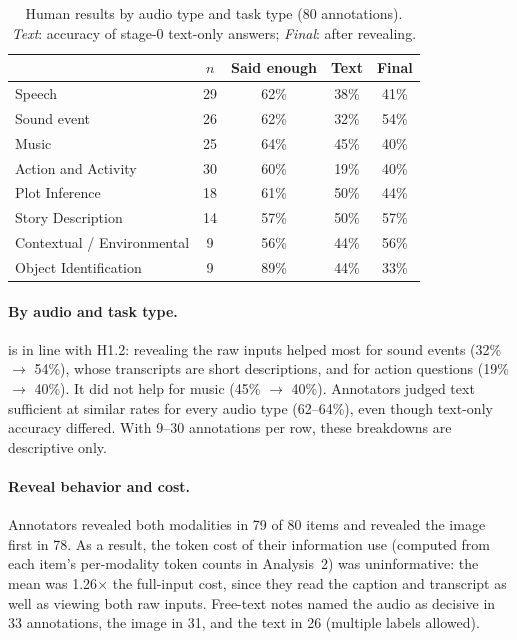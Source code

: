 \begin{table}[h]
\caption{Human results by audio type and task type (80 annotations). \emph{Text}: accuracy of stage-0
text-only answers; \emph{Final}: after revealing.}
\label{tab:app-human-breakdown}
\centering\small
\setlength{\tabcolsep}{4pt}
\begin{tabular}{lcccc}
\toprule
 & $n$ & Said enough & Text & Final \\
\midrule
Speech      & 29 & 62\% & 38\% & 41\% \\
Sound event & 26 & 62\% & 32\% & 54\% \\
Music       & 25 & 64\% & 45\% & 40\% \\
\midrule
Action and Activity          & 30 & 60\% & 19\% & 40\% \\
Plot Inference               & 18 & 61\% & 50\% & 44\% \\
Story Description            & 14 & 57\% & 50\% & 57\% \\
Contextual / Environmental   &  9 & 56\% & 44\% & 56\% \\
Object Identification        &  9 & 89\% & 44\% & 33\% \\
\bottomrule
\end{tabular}
\end{table}

\paragraph{By audio and task type.}  is in line
with H1.2: revealing the raw inputs helped most for sound events (32\% $\to$
54\%), whose transcripts are short descriptions, and for action questions
(19\% $\to$ 40\%). It did not help for music (45\% $\to$ 40\%). Annotators judged
text sufficient at similar rates for every audio type (62--64\%), even though
text-only accuracy differed. With 9--30 annotations per row, these breakdowns are
descriptive only.

\paragraph{Reveal behavior and cost.} Annotators revealed both modalities in 79
of 80 items and revealed the image first in 78. As a result, the token cost of
their information use (computed from each item's per-modality token counts in
Analysis~2) was uninformative: the mean was 1.26$\times$ the full-input cost,
since they read the caption and transcript as well as viewing both raw inputs.
Free-text notes named the audio as decisive in 33 annotations, the image in 31,
and the text in 26 (multiple labels allowed).

